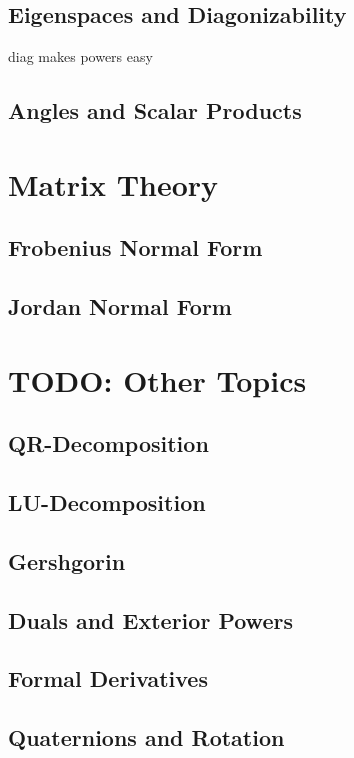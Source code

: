 	\subsection{Eigenspaces and Diagonizability}
	diag makes powers easy
	\subsection{Angles and Scalar Products}

	\newpage
	\section{Matrix Theory}
	\subsection{Frobenius Normal Form}
	\subsection{Jordan Normal Form}

	\newpage
	\section{TODO: Other Topics}
	\subsection{QR-Decomposition}
	\subsection{LU-Decomposition}
	\subsection{Gershgorin}
	\subsection{Duals and Exterior Powers}
	\subsection{Formal Derivatives}
	\subsection{Quaternions and Rotation}
